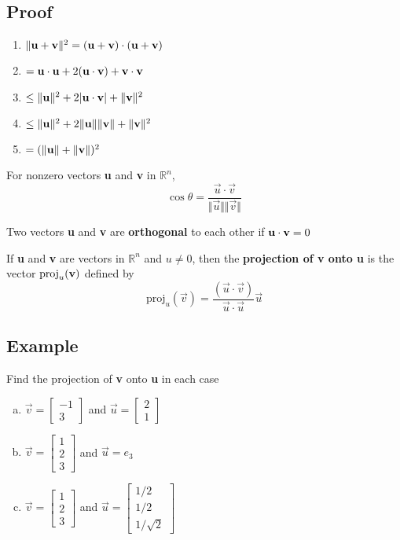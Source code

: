 \subsection*{Proof}
\begin{enumerate}
    \item[] $\Vert\mathbf{u+v}\Vert^2=\mathbf{(u+v)\cdot(u+v)}$
    \item[] $=\mathbf{u\cdot u}+2(\mathbf{u\cdot v})+\mathbf{v\cdot v}$
    \item[] $\leq\Vert\mathbf{u}\Vert^2+2|\mathbf{u\cdot v}|+\Vert\mathbf{v}\Vert^2$
    \item[] $\leq\Vert\mathbf{u}\Vert^2+2\Vert\mathbf{u}\Vert \Vert\mathbf{v}\Vert+\Vert\mathbf{v}\Vert^2$
    \item[] $=(\Vert\mathbf{u}\Vert+\Vert\mathbf{v}\Vert)^2$
\end{enumerate}

For nonzero vectors \textbf{u} and \textbf{v} in $\mathbb{R}^n$,
$$\cos{\theta}=\frac{\vec{u}\cdot\vec{v}}{\Vert\vec{u}\Vert \Vert\vec{v}\Vert}$$

Two vectors \textbf{u} and \textbf{v} are \textbf{orthogonal} to each other if
$\mathbf{u\cdot v} = 0$

If \textbf{u} and \textbf{v} are vectors in $\mathbb{R}^n$ and $u\neq 0$, then the
\textbf{projection of v onto u} is the vector $\text{proj}_u(\mathbf{v})$ defined by
$$\text{proj}_u(\vec{v})=\frac{(\vec{u}\cdot\vec{v})}{\vec{u}\cdot\vec{u}}\vec{u}$$

\subsection*{Example}
Find the projection of \textbf{v} onto \textbf{u} in each case
\begin{enumerate}[(a)]
    \item $\vec{v}=\begin{bmatrix}
                  -1 \\ 3
              \end{bmatrix}$ and $\vec{u}=\begin{bmatrix}
                  2 \\ 1
              \end{bmatrix}$
    \item $\vec{v}=\begin{bmatrix}
                  1 \\ 2 \\ 3
              \end{bmatrix}$ and $\vec{u}=e_3$
    \item $\vec{v}=\begin{bmatrix}
                  1 \\ 2 \\ 3
              \end{bmatrix}$ and $\vec{u}=\begin{bmatrix}
                  1/2 \\ 1/2 \\ 1/\sqrt{2}
              \end{bmatrix}$
\end{enumerate}


